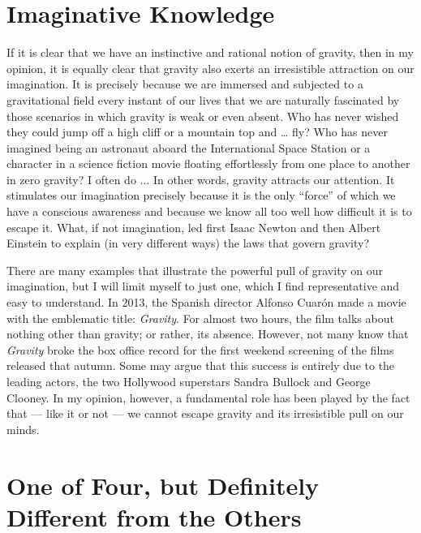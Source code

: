 \section{Imaginative Knowledge}\label{sec:01-imaginative}

If it is clear that we have an instinctive and rational notion of gravity, then in my
opinion, it is equally clear that gravity also exerts an irresistible attraction on our
imagination. It is precisely because we are immersed and subjected to a gravitational
field every instant of our lives that we are naturally fascinated by those scenarios in
which gravity is weak or even absent. Who has never wished they could jump off a high
cliff or a mountain top and \ldots{} fly? Who has never imagined being an astronaut
aboard the International Space Station or a character in a science fiction movie
floating effortlessly from one place to another in zero gravity? I often do ... In other
words, gravity attracts our attention. It stimulates our imagination precisely because
it is the only ``force'' of which we have a conscious awareness and because we know all
too well how difficult it is to escape it. What, if not imagination, led first Isaac
Newton and then Albert Einstein to explain
(in very different ways) the laws that govern gravity?

There are many examples that illustrate the powerful pull of gravity on our imagination,
but I will limit myself to just one, which I find representative and easy to understand.
In 2013, the Spanish director Alfonso Cuarón made a
movie with the emblematic title: \emph{Gravity}. For almost two hours, the film talks
about nothing other than gravity; or rather, its absence. However, not many know that
\emph{Gravity} broke the box office record for the first weekend screening of the films
released that autumn. Some may argue that this success is entirely due to the leading
actors, the two Hollywood superstars Sandra Bullock and George Clooney. In my opinion,
however, a fundamental role has been played by the fact that --- like it or not --- we
cannot escape gravity and its irresistible pull on our minds.

\section{One of Four, but Definitely Different from the Others}\label{sec:01-interactions}

